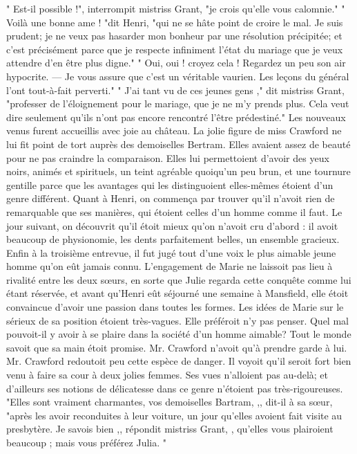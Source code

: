 " Est-il possible !", interrompit mistriss Grant, "je crois qu'elle vous calomnie."
" Voilà une bonne ame ! "dit Henri, "qui ne se hâte point de croire le mal. Je suis prudent; je ne veux pas hasarder mon bonheur par une résolution précipitée; et c'est précisément parce que je respecte infiniment l'état du mariage que je veux attendre d'en être plus digne."
" Oui, oui ! croyez cela ! Regardez un peu son air hypocrite. — Je vous assure que c'est un véritable vaurien. Les leçons du général l'ont tout-à-fait perverti."
" J'ai tant vu de ces jeunes gens ," dit mistriss Grant, "professer de l'éloignement pour le mariage, que je ne m'y prends plus. Cela veut dire seulement qu'ils n'ont pas encore rencontré l'être prédestiné."
Les nouveaux venus furent accueillis avec joie au château. La jolie figure de miss Crawford ne lui fit point de tort auprès des demoiselles Bertram. Elles avaient assez de\setcounter{page}{507} beauté pour ne pas craindre la comparaison. Elles lui permettoient d'avoir des yeux noirs, animés et spirituels, un teint agréable quoiqu'un peu brun, et une tournure gentille parce que les avantages qui les distinguoient elles-mêmes étoient d'un genre différent.
Quant à Henri, on commença par trouver qu'il n'avoit rien de remarquable que ses manières, qui étoient celles d'un homme comme il faut. Le jour suivant, on découvrit qu'il étoit mieux qu'on n'avoit cru d'abord : il avoit beaucoup de physionomie, les dents parfaitement belles, un ensemble gracieux. Enfin à la troisième entrevue, il fut jugé tout d'une voix le plus aimable jeune homme qu'on eût jamais connu. L'engagement de Marie ne laissoit pas lieu à rivalité entre les deux sœurs, en sorte que Julie regarda cette conquête comme lui étant réservée, et avant qu'Henri eût séjourné une semaine à Mansfield, elle étoit convaincue d'avoir une passion dans toutes les formes.
Les idées de Marie sur le sérieux de sa position étoient très-vagues. Elle préféroit n'y pas penser. Quel mal pouvoit-il y avoir à se plaire dans la société d'un homme aimable? Tout le monde savoit que sa main étoit promise. Mr. Crawford n'avoit qu'à prendre garde à lui.\setcounter{page}{508} Mr. Crawford redoutoit peu cette espèce de danger. Il voyoit qu'il seroit fort bien venu à faire sa cour à deux jolies femmes. Ses vues n'alloient pas au-delà; et d'ailleurs ses notions de délicatesse dans ce genre n'étoient pas très-rigoureuses.
"Elles sont vraiment charmantes, vos demoiselles Bartram, ,, dit-il à sa sœur, "après les avoir reconduites à leur voiture, un jour qu'elles avoient fait visite au presbytère.
Je savois bien ,, répondit mistriss Grant, , qu'elles vous plairoient beaucoup ; mais vous préférez Julia. "
